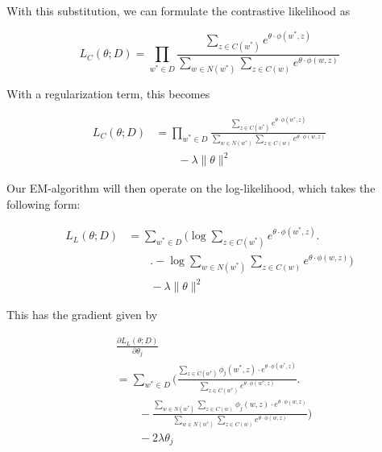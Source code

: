 \documentclass[11pt,twocolumn]{article}
\begin{document}
With this substitution, we can formulate the contrastive likelihood as

\begin{equation}
    L_C(\theta; D) = \prod_{w^*\in D} \frac{\sum_{z\in C(w^*)} e^{\theta\cdot\phi(w^*,z)}} {\sum_{w\in N(w^*)} \sum_{z\in C(w)} e^{\theta\cdot\phi(w,z)}}
\end{equation}

With a regularization term, this becomes

\begin{equation}
    \begin{split}
        L_C(\theta; D) &= \prod_{w^*\in D} \frac{\sum_{z\in C(w^*)} e^{\theta\cdot\phi(w^*,z)}} {\sum_{w\in N(w^*)} \sum_{z\in C(w)} e^{\theta\cdot\phi(w,z)}} \\
        &\qquad - \lambda \|\theta\|^2
    \end{split}
\end{equation}

Our EM-algorithm will then operate on the log-likelihood, which takes the following form:

\begin{equation}
    \begin{split}
        L_L(\theta; D) &= \sum_{w^*\in D} \Bigg(\log \sum_{z\in C(w^*)} e^{\theta\cdot\phi(w^*,z)} \Bigg.\\
        &\qquad\Bigg. -\log \sum_{w\in N(w^*)} \sum_{z\in C(w)} e^{\theta\cdot\phi(w,z)} \Bigg) \\
        &\qquad - \lambda \|\theta\|^2
    \end{split}
\end{equation}

This has the gradient given by

\begin{equation}
    \begin{split}
        &\frac{\partial L_L(\theta; D)}{\partial \theta_j} \\
        &= \sum_{w^*\in D} \Bigg( \frac{\sum_{z\in C(w^*)} \phi_j(w^*,z)\cdot e^{\theta\cdot\phi(w^*,z)}} {\sum_{z\in C(w^*)} e^{\theta\cdot\phi(w^*,z)}} \Bigg. \\
        &\qquad -\frac{\sum_{w\in N(w^*)} \sum_{z\in C(w)} \phi_j(w,z)\cdot e^{\theta\cdot\phi(w,z)}} {\sum_{w\in N(w^*)} \sum_{z\in C(w)} e^{\theta\cdot\phi(w,z)}} \Bigg) \\
        &\qquad -2\lambda\theta_j
    \end{split}
\end{equation}
\end{document}
